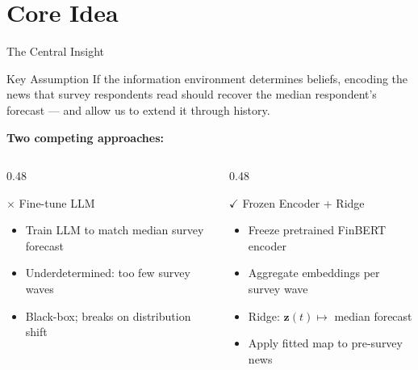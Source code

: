 \documentclass[aspectratio=169, 11pt]{beamer}
\newcommand{\zt}{\mathbf{z}(t)}
\begin{document}
\section{Core Idea}

\begin{frame}{The Central Insight}

\begin{alertblock}{Key Assumption}
If the information environment determines beliefs, encoding the news that survey respondents read should recover the median respondent's forecast --- and allow us to extend it through history.
\end{alertblock}

\vspace{0.3cm}
\textbf{Two competing approaches:}

\vspace{0.2cm}
\begin{columns}
\begin{column}{0.48\textwidth}
  \begin{block}{\textcolor{redcol}{$\times$} Fine-tune LLM}
    \begin{itemize}\itemsep2pt
      \item Train LLM to match median survey forecast
      \item Underdetermined: too few survey waves
      \item Black-box; breaks on distribution shift
    \end{itemize}
  \end{block}
\end{column}
\begin{column}{0.48\textwidth}
  \begin{exampleblock}{\textcolor{greencol}{$\checkmark$} Frozen Encoder + Ridge}
    \begin{itemize}\itemsep2pt
      \item Freeze pretrained FinBERT encoder
      \item Aggregate embeddings per survey wave
      \item Ridge: $\zt \mapsto$ median forecast
      \item Apply fitted map to pre-survey news
    \end{itemize}
  \end{exampleblock}
\end{column}
\end{columns}

\end{frame}
\end{document}
